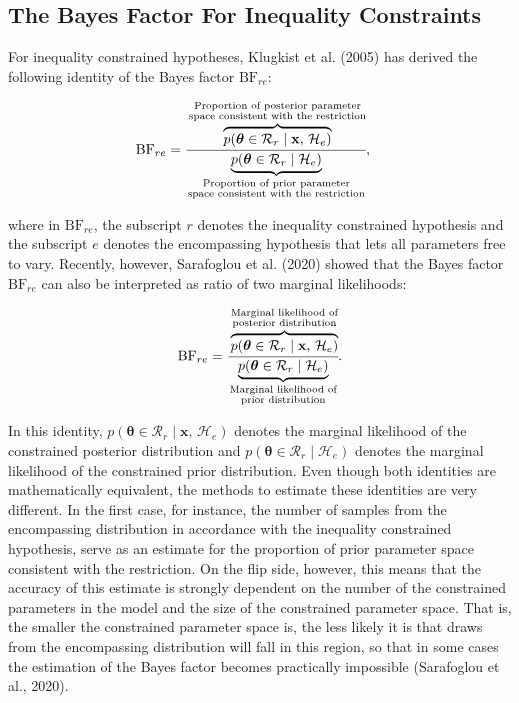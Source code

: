 \documentclass[
  english,
  man,floatsintext]{apa6}
\begin{document}
\hypertarget{the-bayes-factor-for-inequality-constraints}{%
\subsection{The Bayes Factor For Inequality Constraints}\label{the-bayes-factor-for-inequality-constraints}}

For inequality constrained hypotheses, Klugkist et al. (2005) has derived the following identity of
the Bayes factor \(\text{BF}_{re}\):

\begin{align}
\label{Eq:klugkistIdentity}
\text{BF}_{re} &= \cfrac{\overbrace{p(\boldsymbol{\theta} \in \mathcal{R}_r \mid \mathbf{x}\text{, }\mathcal{H}_e)}^{\substack{\text{Proportion of posterior parameter}\\\text{space consistent with the restriction}}}}{\underbrace{p(\boldsymbol{\theta} \in \mathcal{R}_r \mid  \mathcal{H}_e)}_{\substack{\text{Proportion of prior parameter}\\\text{space consistent with the restriction}}}},
\end{align}

where in \(\text{BF}_{re}\), the subscript \(r\) denotes the inequality constrained hypothesis and the subscript \(e\) denotes the encompassing hypothesis that lets all parameters free to vary. Recently, however, Sarafoglou et al. (2020) showed that the Bayes factor \(\text{BF}_{re}\) can also be interpreted as ratio of two marginal likelihoods:

\begin{align}
\label{Eq:sarafoglouIdentity}
\text{BF}_{re} =
\cfrac{\overbrace{p(\boldsymbol{\theta} \in \mathcal{R}_r \mid \mathbf{x}\text{, }\mathcal{H}_e)}^{\substack{\text{Marginal likelihood of}\\\text{posterior distribution}}}}{\underbrace{p(\boldsymbol{\theta} \in \mathcal{R}_r \mid  \mathcal{H}_e)}_{\substack{\text{Marginal likelihood of}\\\text{prior distribution}}}}.
\end{align}

In this identity, \(p(\boldsymbol{\theta} \in \mathcal{R}_r \mid \mathbf{x}\text{, }\mathcal{H}_e)\) denotes the marginal likelihood of the constrained posterior distribution and \(p(\boldsymbol{\theta} \in \mathcal{R}_r \mid \mathcal{H}_e)\) denotes the marginal likelihood of the constrained prior distribution. Even though both identities are mathematically equivalent, the methods to estimate these identities are very different.
In the first case, for instance, the number of samples from the encompassing distribution in accordance with the inequality constrained hypothesis, serve as an estimate for the proportion of prior parameter space consistent with the restriction. On the flip side, however, this means that the accuracy of this estimate is strongly dependent on the number of the constrained parameters in the model and the size of the constrained parameter space. That is, the smaller the constrained parameter space is, the less likely it is that draws from the encompassing distribution will fall in this region, so that in some cases the estimation of the Bayes factor becomes practically impossible (Sarafoglou et al., 2020).
\end{document}
